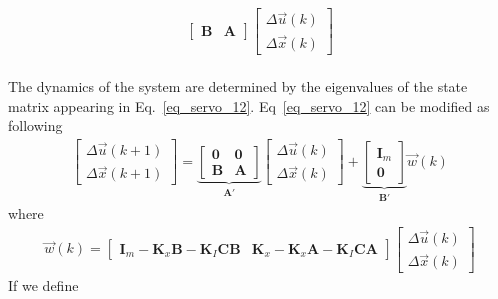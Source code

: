 \documentclass[12pt,a4paper,oneside]{book}
\begin{document}
\begin{onehalfspace}
\begin{equation}
\begin{aligned}
\begin{bmatrix}
			\mathbf{B} & \mathbf{A}
		\end{bmatrix}
		\begin{bmatrix}
			\Delta\vec{u}(k) \\[6pt]  
			\Delta\vec{x}(k)
		\end{bmatrix}
	\end{aligned}
\end{equation}\\
The dynamics of the system are determined by the eigenvalues of the state 
matrix appearing in Eq.~\eqref{eq_servo_12}. Eq~\eqref{eq_servo_12} can be 
modified as following
\begin{equation}\label{eq_servo_13}
	\begin{aligned}
		\begin{bmatrix}
			\Delta\vec{u}(k+1) \\[6pt]  
			\Delta\vec{x}(k+1)
		\end{bmatrix} =
		\underbrace{\begin{bmatrix}
				\mathbf{0} & \mathbf{0} \\[6pt]  
				\mathbf{B} & \mathbf{A}
		\end{bmatrix}}_{\mathbf{A'}}
		\begin{bmatrix}
			\Delta\vec{u}(k) \\[6pt]  
			\Delta\vec{x}(k)
		\end{bmatrix}+
		\underbrace{\begin{bmatrix}
				\mathbf{I}_m \\[6pt]  
				\mathbf{0}
		\end{bmatrix}}_{\mathbf{B'}}\vec{w}(k)
	\end{aligned}
\end{equation}
where 
\begin{equation}\label{eq_servo_14}
	\begin{aligned}
		\vec{w}(k) = 
		\begin{bmatrix}
			\mathbf{I}_m-\mathbf{K}_x\mathbf{B}-\mathbf{K}_I\mathbf{C}\mathbf{B}
			&  
			\mathbf{K}_x-\mathbf{K}_x\mathbf{A}-\mathbf{K}_I\mathbf{C}\mathbf{A}
		\end{bmatrix}
		\begin{bmatrix}
			\Delta\vec{u}(k) \\[6pt]  
			\Delta\vec{x}(k)
		\end{bmatrix}
	\end{aligned}
\end{equation}
If we define 
\begin{equation*}
	\begin{aligned}

\end{aligned}
\end{equation*}
\end{onehalfspace}
\end{document}
